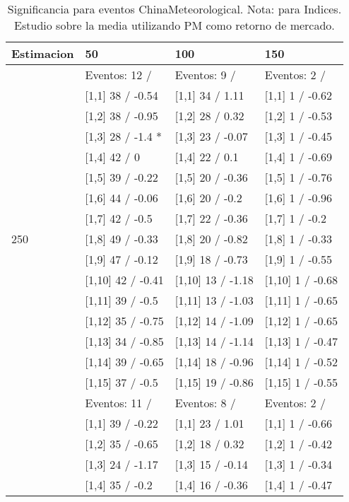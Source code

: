 \begin{table}

\caption{Significancia para eventos ChinaMeteorological. Nota: para Indices. Estudio sobre la media utilizando PM como retorno de mercado.}
\centering
\begin{tabular}[t]{llll}
\toprule
Estimacion & 50 & 100 & 150\\
\midrule
 & Eventos:  12 / & Eventos:  9 / & Eventos:  2 /\\
 & {}[1,1] 38  / -0.54 & {}[1,1] 34  / 1.11 & {}[1,1] 1  / -0.62\\
 & {}[1,2] 38  / -0.95 & {}[1,2] 28  / 0.32 & {}[1,2] 1  / -0.53\\
 & {}[1,3] 28  / -1.4 * & {}[1,3] 23  / -0.07 & {}[1,3] 1  / -0.45\\
 & {}[1,4] 42  / 0 & {}[1,4] 22  / 0.1 & {}[1,4] 1  / -0.69\\
\addlinespace
 & {}[1,5] 39  / -0.22 & {}[1,5] 20  / -0.36 & {}[1,5] 1  / -0.76\\
 & {}[1,6] 44  / -0.06 & {}[1,6] 20  / -0.2 & {}[1,6] 1  / -0.96\\
 & {}[1,7] 42  / -0.5 & {}[1,7] 22  / -0.36 & {}[1,7] 1  / -0.2\\
250 & {}[1,8] 49  / -0.33 & {}[1,8] 20  / -0.82 & {}[1,8] 1  / -0.33\\
 & {}[1,9] 47  / -0.12 & {}[1,9] 18  / -0.73 & {}[1,9] 1  / -0.55\\
\addlinespace
 & {}[1,10] 42  / -0.41 & {}[1,10] 13  / -1.18 & {}[1,10] 1  / -0.68\\
 & {}[1,11] 39  / -0.5 & {}[1,11] 13  / -1.03 & {}[1,11] 1  / -0.65\\
 & {}[1,12] 35  / -0.75 & {}[1,12] 14  / -1.09 & {}[1,12] 1  / -0.65\\
 & {}[1,13] 34  / -0.85 & {}[1,13] 14  / -1.14 & {}[1,13] 1  / -0.47\\
 & {}[1,14] 39  / -0.65 & {}[1,14] 18  / -0.96 & {}[1,14] 1  / -0.52\\
\addlinespace
 & {}[1,15] 37  / -0.5 & {}[1,15] 19  / -0.86 & {}[1,15] 1  / -0.55\\
 & Eventos:  11 / & Eventos:  8 / & Eventos:  2 /\\
 & {}[1,1] 39  / -0.22 & {}[1,1] 23  / 1.01 & {}[1,1] 1  / -0.66\\
 & {}[1,2] 35  / -0.65 & {}[1,2] 18  / 0.32 & {}[1,2] 1  / -0.42\\
 & {}[1,3] 24  / -1.17 & {}[1,3] 15  / -0.14 & {}[1,3] 1  / -0.34\\
\addlinespace
 & {}[1,4] 35  / -0.2 & {}[1,4] 16  / -0.36 & {}[1,4] 1  / -0.47\\

\end{tabular}
\end{table}
